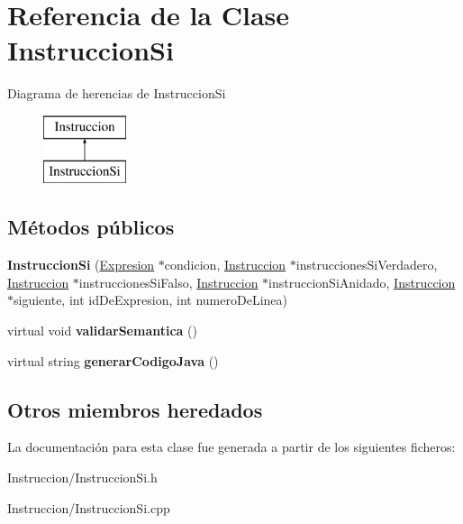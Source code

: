 \hypertarget{class_instruccion_si}{\section{Referencia de la Clase Instruccion\-Si}
\label{class_instruccion_si}
}
Diagrama de herencias de Instruccion\-Si\begin{figure}[H]
\begin{center}
\leavevmode
\includegraphics[height=2.000000cm]{class_instruccion_si}
\end{center}
\end{figure}
\subsection*{Métodos públicos}
\begin{DoxyCompactItemize}
\item 
\hypertarget{class_instruccion_si_ace01e331a65f23e90b422e435975d074}{{\bfseries Instruccion\-Si} (\hyperlink{class_expresion}{Expresion} $\ast$condicion, \hyperlink{class_instruccion}{Instruccion} $\ast$instrucciones\-Si\-Verdadero, \hyperlink{class_instruccion}{Instruccion} $\ast$instrucciones\-Si\-Falso, \hyperlink{class_instruccion}{Instruccion} $\ast$instruccion\-Si\-Anidado, \hyperlink{class_instruccion}{Instruccion} $\ast$siguiente, int id\-De\-Expresion, int numero\-De\-Linea)}\label{class_instruccion_si_ace01e331a65f23e90b422e435975d074}

\item 
\hypertarget{class_instruccion_si_a926b9ce81a71ee3ba8ccc43a9324f62a}{virtual void {\bfseries validar\-Semantica} ()}\label{class_instruccion_si_a926b9ce81a71ee3ba8ccc43a9324f62a}

\item 
\hypertarget{class_instruccion_si_a4db7a3a6d7141b29a507d42b010ee596}{virtual string {\bfseries generar\-Codigo\-Java} ()}\label{class_instruccion_si_a4db7a3a6d7141b29a507d42b010ee596}

\end{DoxyCompactItemize}
\subsection*{Otros miembros heredados}


La documentación para esta clase fue generada a partir de los siguientes ficheros\-:\begin{DoxyCompactItemize}
\item 
Instruccion/Instruccion\-Si.\-h\item 
Instruccion/Instruccion\-Si.\-cpp\end{DoxyCompactItemize}
